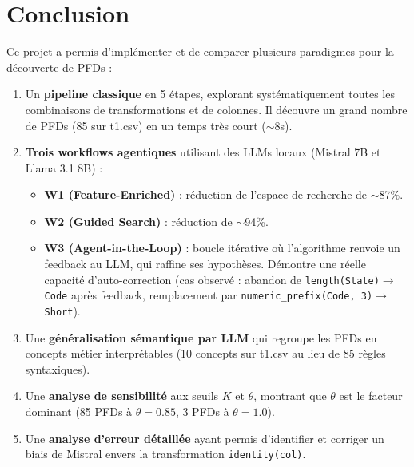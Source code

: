 \documentclass[12pt,a4paper]{article}
\begin{document}
\section{Conclusion}
\label{sec:conclusion}

Ce projet a permis d'impl\'{e}menter et de comparer plusieurs paradigmes pour la d\'{e}couverte de PFDs :

\begin{enumerate}
    \item Un \textbf{pipeline classique} en 5 \'{e}tapes, explorant syst\'{e}matiquement toutes les combinaisons de transformations et de colonnes. Il d\'{e}couvre un grand nombre de PFDs (85 sur t1.csv) en un temps tr\`{e}s court ($\sim$8s).

    \item \textbf{Trois workflows agentiques} utilisant des LLMs locaux (Mistral 7B et Llama 3.1 8B) :
    \begin{itemize}
        \item \textbf{W1 (Feature-Enriched)} : r\'{e}duction de l'espace de recherche de $\sim$87\%.
        \item \textbf{W2 (Guided Search)} : r\'{e}duction de $\sim$94\%.
        \item \textbf{W3 (Agent-in-the-Loop)} : boucle it\'{e}rative o\`{u} l'algorithme renvoie un feedback au LLM, qui raffine ses hypoth\`{e}ses. D\'{e}montre une r\'{e}elle capacit\'{e} d'auto-correction (cas observ\'{e} : abandon de \texttt{length(State)$\to$Code} apr\`{e}s feedback, remplacement par \texttt{numeric\_prefix(Code, 3)$\to$Short}).
    \end{itemize}

    \item Une \textbf{g\'{e}n\'{e}ralisation s\'{e}mantique par LLM} qui regroupe les PFDs en concepts m\'{e}tier interpr\'{e}tables (10 concepts sur t1.csv au lieu de 85 r\`{e}gles syntaxiques).

    \item Une \textbf{analyse de sensibilit\'{e}} aux seuils $K$ et $\theta$, montrant que $\theta$ est le facteur dominant (85 PFDs \`{a} $\theta=0.85$, 3 PFDs \`{a} $\theta=1.0$).

    \item Une \textbf{analyse d'erreur d\'{e}taill\'{e}e} ayant permis d'identifier et corriger un biais de Mistral envers la transformation \texttt{identity(col)}.
\end{enumerate}
\end{document}
